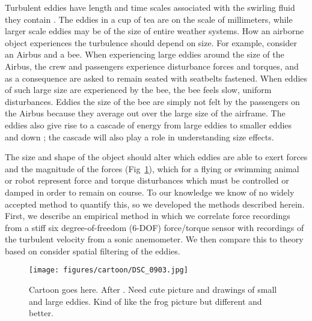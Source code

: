 \documentclass{jfm}
\newcommand{\sixDOF}{6-DOF}
\begin{document}
Turbulent eddies have length and time scales associated with the swirling fluid they contain \cite{Tennekes:1972,Davidson:2004}.  The eddies in a cup of tea are on the scale of millimeters, while larger scale eddies may be of the size of entire weather systems.  How an airborne object experiences the turbulence should depend on size.  For example, consider an Airbus and a bee.  When experiencing large eddies around the size of the Airbus, the crew and passengers experience disturbance forces and torques, and as a consequence are asked to remain seated with seatbelts fastened.  When eddies of such large size are experienced by the bee, the bee feels slow, uniform disturbances.  Eddies the size of the bee are simply not felt by the passengers on the Airbus because they average out over the large size of the airframe. The eddies also give rise to a cascade of energy from large eddies to smaller eddies and down \cite{Davidson:2004, someone}; the cascade will also play a role in understanding size effects. 

The size and shape of the object should alter which eddies are able to exert forces and the magnitude of the forces (Fig~\ref{fig:cartoon}), which for a flying or swimming animal or robot represent force and torque disturbances which must be controlled or damped in order to remain on course.  To our knowledge we know of no widely accepted method to quantify this, so we developed the methods described herein.  First, we describe an empirical method in which we correlate force recordings from a stiff six degree-of-freedom (\sixDOF) force/torque sensor with recordings of the turbulent velocity from a sonic anemometer.  We then compare this to theory based on consider spatial filtering of the eddies. 

\begin{figure} 
\centerline{\texttt{[image: figures/cartoon/DSC\_0903.jpg]}}%
\caption{Cartoon goes here. After \citep{McCay:2003}. Need cute picture and drawings of small and large eddies.  Kind of like the frog picture but different and better.}
\label{fig:cartoon}
\end{figure}


\end{document}
